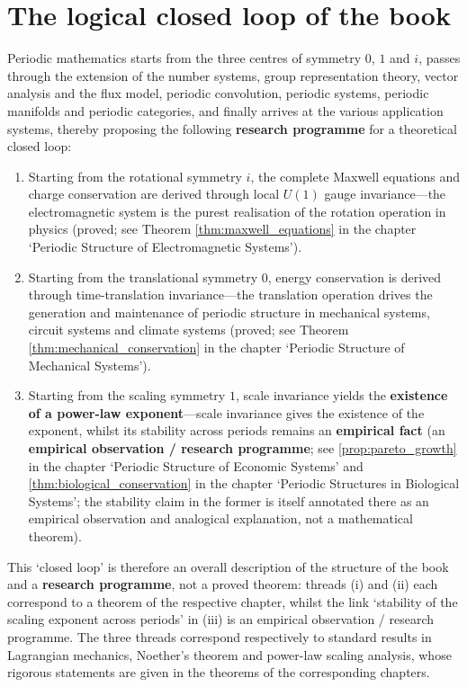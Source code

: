 \section{The logical closed loop of the book}

\begin{remark}\label{thm:closing_loop}
Periodic mathematics starts from the three centres of symmetry $0$, $1$ and $i$, passes through the extension of the number systems, group representation theory, vector analysis and the flux model, periodic convolution, periodic systems, periodic manifolds and periodic categories, and finally arrives at the various application systems, thereby proposing the following \textbf{research programme} for a theoretical closed loop:
\begin{enumerate}[label=(\roman*)]
    \item Starting from the rotational symmetry $i$, the complete Maxwell equations and charge conservation are derived through local $U(1)$ gauge invariance---the electromagnetic system is the purest realisation of the rotation operation in physics (proved; see Theorem \ref{thm:maxwell_equations} in the chapter `Periodic Structure of Electromagnetic Systems').
    \item Starting from the translational symmetry $0$, energy conservation is derived through time-translation invariance---the translation operation drives the generation and maintenance of periodic structure in mechanical systems, circuit systems and climate systems (proved; see Theorem \ref{thm:mechanical_conservation} in the chapter `Periodic Structure of Mechanical Systems').
    \item Starting from the scaling symmetry $1$, scale invariance yields the \textbf{existence of a power-law exponent}---scale invariance gives the existence of the exponent, whilst its stability across periods remains an \textbf{empirical fact} (an \textbf{empirical observation / research programme}; see \ref{prop:pareto_growth} in the chapter `Periodic Structure of Economic Systems' and \ref{thm:biological_conservation} in the chapter `Periodic Structures in Biological Systems'; the stability claim in the former is itself annotated there as an empirical observation and analogical explanation, not a mathematical theorem).
\end{enumerate}
This `closed loop' is therefore an overall description of the structure of the book and a \textbf{research programme}, not a proved theorem: threads (i) and (ii) each correspond to a theorem of the respective chapter, whilst the link `stability of the scaling exponent across periods' in (iii) is an empirical observation / research programme. The three threads correspond respectively to standard results in Lagrangian mechanics, Noether's theorem and power-law scaling analysis, whose rigorous statements are given in the theorems of the corresponding chapters.
\end{remark}

